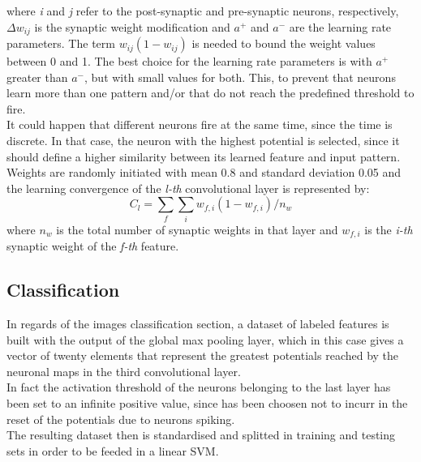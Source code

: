 \documentclass[11pt,a4paper]{scrartcl}
\begin{document}
where \textit{i} and \textit{j} refer to the post-synaptic and pre-synaptic neurons, respectively, $ \Delta w_{ij} $ is the synaptic weight modification and $ a^{+} $ and $ a^{-} $ are the learning rate parameters. The term $ w_{ij}(1-w_{ij}) $ is needed to bound the weight values between 0 and 1. The best choice for the learning rate parameters is with $ a^{+} $ greater than $ a^{-} $, but with small values for both. This, to prevent that neurons learn more than one pattern and/or that do not reach the predefined threshold to fire.\\
It could happen that different neurons fire at the same time, since the time is discrete. In that case, the neuron with the highest potential is selected, since it should define a higher similarity between its learned feature and input pattern.\\
Weights are randomly initiated with mean 0.8 and standard deviation 0.05 and the learning convergence of the \textit{l-th} convolutional layer is represented by:
\begin{equation*}
C_{l} = \sum_{f}\sum_{i}w_{f,i}(1-w_{f,i})/n_{w}
\end{equation*}
where $ n_{w} $ is the total number of synaptic weights in that layer and $ w_{f,i} $ is the \textit{i-th} synaptic weight of the \textit{f-th} feature.

\subsection{Classification}
In regards of the images classification section, a dataset of labeled features is built with the output of the global max pooling layer, which in this case gives a vector of twenty elements that represent the greatest potentials reached by the neuronal maps in the third convolutional layer.\\
In fact the activation threshold of the neurons belonging to the last layer has been set to an infinite positive value, since has been choosen not to incurr in the reset of the potentials due to neurons spiking.\\
The resulting dataset then is standardised and splitted in training and testing sets in order to be feeded in a linear SVM.


\end{document}
